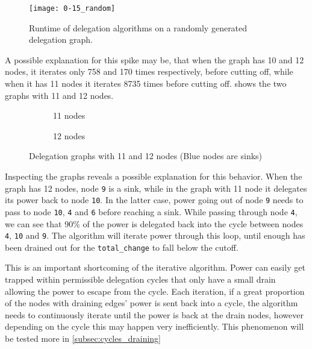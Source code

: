 \begin{figure}[t]
    \centering
    \texttt{[image: 0-15\_random]}
    \caption{Runtime of delegation algorithms on a randomly generated delegation graph.}
    \label{fig:random-tiny}
\end{figure}

A possible explanation for this spike may be, that when the graph has 10 and 12 nodes, it iterates only 758 and 170 times respectively, before cutting off, while when it has 11 nodes it iterates 8735 times before cutting off.  shows the two graphs with 11 and 12 nodes.

\begin{figure}[t]
    \centering
    \begin{subfigure}[t]{0.45\textwidth}
        \centering
        \caption{11 nodes}
        \label{subfig:random-11and12-11}
    \end{subfigure}
    \hfill
    \begin{subfigure}[t]{0.45\textwidth}
        \centering
        \caption{12 nodes}
    \end{subfigure}
    \caption{Delegation graphs with 11 and 12 nodes (Blue nodes are sinks)}
    \label{fig:random-11and12}
\end{figure}

Inspecting the graphs reveals a possible explanation for this behavior. When the graph has 12 nodes, node \texttt{9} is a sink, while in the graph with 11 node it delegates its power back to node \texttt{10}. In the latter case, power going out of node \texttt{9} needs to pass to node \texttt{10}, \texttt{4} and \texttt{6} before reaching a sink. While passing through node \texttt{4}, we can see that 90\% of the power is delegated back into the cycle between nodes \texttt{4}, \texttt{10} and \texttt{9}. The algorithm will iterate power through this loop, until enough has been drained out for the \texttt{total\_change} to fall below the cutoff. 

This is an important shortcoming of the iterative algorithm. Power can easily get trapped within permissible delegation cycles that only have a small drain allowing the power to escape from the cycle. Each iteration, if a great proportion of the nodes with draining edges' power is sent back into a cycle, the algorithm needs to continuously iterate until the power is back at the drain nodes, however depending on the cycle this may happen very inefficiently. This phenomenon will be tested more in \cref{subsec:cycles_draining}

